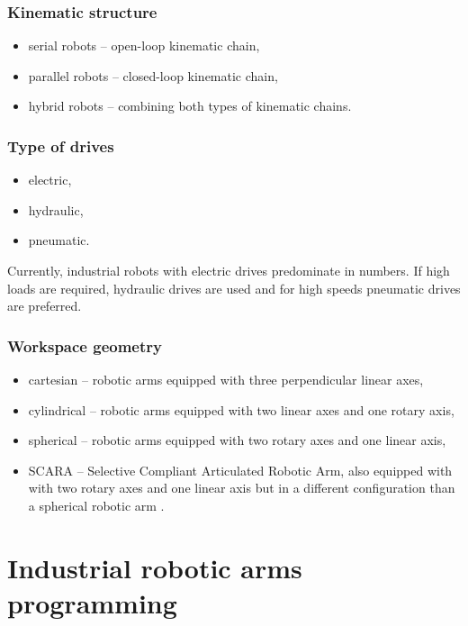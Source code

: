 \subsubsection*{Kinematic structure}

\begin{itemize}
    \item serial robots -- open-loop kinematic chain,
    \item parallel robots -- closed-loop kinematic chain,
    \item hybrid robots -- combining both types of kinematic chains.
\end{itemize}


\subsubsection*{Type of drives}

\begin{itemize}
    \item electric,
    \item hydraulic,
    \item pneumatic.
\end{itemize}

Currently, industrial robots with electric drives predominate in numbers. If high loads are required, hydraulic drives are used and for high speeds pneumatic drives are preferred.

\subsubsection*{Workspace geometry}

\begin{itemize}
    \item cartesian -- robotic arms equipped with three perpendicular linear axes,
    \item cylindrical -- robotic arms equipped with two linear axes and one rotary axis,
    \item spherical --  robotic arms equipped with two rotary axes and one linear axis,
    \item SCARA -- Selective Compliant Articulated Robotic Arm, also equipped with with two rotary axes and one linear axis but in a different configuration than a spherical robotic arm \cite{vsb_2007}.
\end{itemize}

\section{Industrial robotic arms programming}

